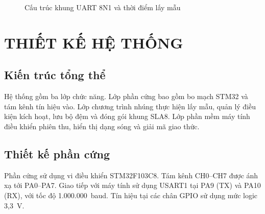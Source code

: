 \begin{figure}[H]
\caption{Cấu trúc khung UART 8N1 và thời điểm lấy mẫu}
\label{fig:uart-frame}
\end{figure}

\chapter{THIẾT KẾ HỆ THỐNG}\label{thiux1ebft-kux1ebf-hux1ec7-thux1ed1ng}

\section{Kiến trúc tổng thể}\label{sec:architecture}

Hệ thống gồm ba lớp chức năng. Lớp phần cứng bao gồm bo mạch STM32 và tám kênh tín hiệu vào. Lớp chương trình nhúng thực hiện lấy mẫu, quản lý điều kiện kích hoạt, lưu bộ đệm và đóng gói khung SLA8. Lớp phần mềm máy tính điều khiển phiên thu, hiển thị dạng sóng và giải mã giao thức.



\section{Thiết kế phần cứng}\label{thiux1ebft-kux1ebf-phux1ea7n-cux1ee9ng}

Phần cứng sử dụng vi điều khiển STM32F103C8. Tám kênh CH0--CH7 được ánh xạ tới PA0--PA7. Giao tiếp với máy tính sử dụng USART1 tại PA9 (TX) và PA10 (RX), với tốc độ 1.000.000~baud. Tín hiệu tại các chân GPIO sử dụng mức logic 3,3~V.

